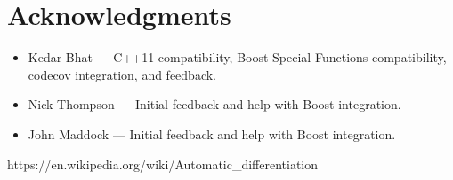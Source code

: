 \documentclass{article}
\begin{document}
\section{Acknowledgments}

\begin{itemize}
\item Kedar Bhat --- C++11 compatibility, Boost Special Functions compatibility, codecov integration, and feedback.
\item Nick Thompson --- Initial feedback and help with Boost integration.
\item John Maddock --- Initial feedback and help with Boost integration.
\end{itemize}

\begin{thebibliography}{1}
 https://en.wikipedia.org/wiki/Automatic\_differentiation
\end{thebibliography}
\end{document}
